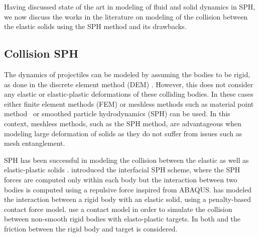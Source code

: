 Having discussed state of the art in modeling of fluid and solid dynamics in
SPH, we now discuss the works in the literature on modeling of the collision
between the elastic solids using the SPH method and its drawbacks.


\subsection{Collision SPH}
The dynamics of projectiles can be modeled by assuming the bodies to be
rigid, as done in the discrete element method (DEM) \parencite{zhan2021surface}.
However, this does not consider any elastic or elastic-plastic deformations of
these colliding bodies. In these cases either finite element methods (FEM)
\parencite{rodrigues2019elastic} or meshless methods such as material point
method~\parencite{sulsky1994particle} or smoothed particle hydrodynamics (SPH)
\parencite{gingold1977smoothed} can be used. In this context, meshless methods, such
as the SPH method, are advantageous when modeling large deformation of solids as
they do not suffer from issues such as mesh entanglement.

SPH has been successful in modeling the collision between the elastic as well as
elastic-plastic solids \parencite{gray2001sph, cleary2010elastoplastic}.
\textcite{yan2021simulation} introduced the interfacial SPH scheme, where the SPH
forces are computed only within each body but the interaction between two bodies
is computed using a repulsive force inspired from ABAQUS.
\textcite{vyas2021collisional} has modeled the interaction between a rigid body with
an elastic solid, using a penalty-based contact force model.
\textcite{mohseni2021particle} use a contact model in order to simulate the
collision between non-smooth rigid bodies with elasto-plastic targets. In both
\parencite{vyas2021collisional} and \parencite{mohseni2021particle} the friction between
the rigid body and target is considered.


